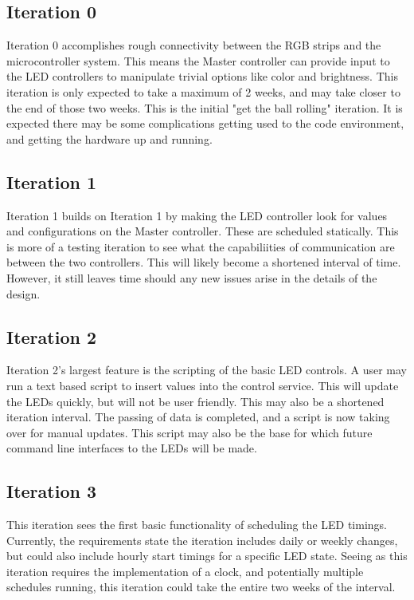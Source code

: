 \documentclass[onecolumn, draftclsnofoot,10pt, compsoc]{IEEEtran}
\begin{document}
		\subsection{Iteration 0}
		Iteration 0 accomplishes rough connectivity between the RGB strips and the microcontroller system.  This means the Master controller can provide input
		to the LED controllers to manipulate trivial options like color and brightness.  This iteration is only expected to take a maximum of 2 weeks, and may
		take closer to the end of those two weeks.  This is the initial "get the ball rolling" iteration. It is expected there may be some complications
		getting used to the code environment, and getting the hardware up and running.

		\subsection{Iteration 1}
		Iteration 1 builds on Iteration 1 by making the LED controller look for values and configurations on the Master controller.  These are scheduled
		statically. This is more of a testing iteration to see what the capabiliities of communication are between the two controllers.  This will likely
		become a shortened interval of time.  However, it still leaves time should any new issues arise in the details of the design.

		\subsection{Iteration 2}
		Iteration 2's largest feature is the scripting of the basic LED controls.  A user may run a text based script to insert values into the control
		service. This will update the LEDs quickly, but will not be user friendly.  This may also be a shortened iteration interval.  The passing of
		data is completed, and a script is now taking over for manual updates.  This script may also be the base for which future command line interfaces to the
		LEDs will	be made.

		\subsection{Iteration 3}
		This iteration sees the first basic functionality of scheduling the LED timings.  Currently, the requirements state the iteration includes daily or
		weekly changes, but could also include hourly start timings for a specific LED state. Seeing as this iteration requires the implementation of a clock,
		and potentially multiple schedules running, this iteration could take the entire two weeks of the interval.
\end{document}
